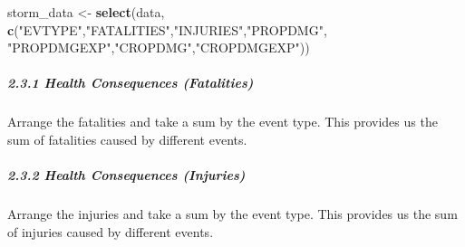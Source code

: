 \documentclass[]{article}
\newenvironment{Shaded}{\begin{snugshade}}{\end{snugshade}}
\newcommand{\DataTypeTok}[1]{\textcolor[rgb]{0.13,0.29,0.53}{#1}}
\newcommand{\DecValTok}[1]{\textcolor[rgb]{0.00,0.00,0.81}{#1}}
\newcommand{\KeywordTok}[1]{\textcolor[rgb]{0.13,0.29,0.53}{\textbf{#1}}}
\newcommand{\NormalTok}[1]{#1}
\newcommand{\OperatorTok}[1]{\textcolor[rgb]{0.81,0.36,0.00}{\textbf{#1}}}
\newcommand{\StringTok}[1]{\textcolor[rgb]{0.31,0.60,0.02}{#1}}
\let\oldsubparagraph\subparagraph
\renewcommand{\subparagraph}[1]{\oldsubparagraph{#1}\mbox{}}
\begin{document}
\begin{Shaded}
\begin{Highlighting}[]
\NormalTok{storm_data <-}\StringTok{ }\KeywordTok{select}\NormalTok{(data, }\KeywordTok{c}\NormalTok{(}\StringTok{"EVTYPE"}\NormalTok{,}\StringTok{"FATALITIES"}\NormalTok{,}\StringTok{"INJURIES"}\NormalTok{,}\StringTok{"PROPDMG"}\NormalTok{, }\StringTok{"PROPDMGEXP"}\NormalTok{,}\StringTok{"CROPDMG"}\NormalTok{,}\StringTok{"CROPDMGEXP"}\NormalTok{)) }
\end{Highlighting}
\end{Shaded}

\hypertarget{health-consequences-fatalities}{%
\subparagraph{2.3.1 Health Consequences
(Fatalities)}\label{health-consequences-fatalities}}

Arrange the fatalities and take a sum by the event type. This provides
us the sum of fatalities caused by different events.

\begin{Shaded}
\end{Shaded}

\hypertarget{health-consequences-injuries}{%
\subparagraph{2.3.2 Health Consequences
(Injuries)}\label{health-consequences-injuries}}

Arrange the injuries and take a sum by the event type. This provides us
the sum of injuries caused by different events.

\begin{Shaded}
\end{Shaded}
\end{document}
